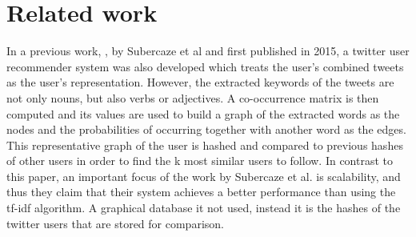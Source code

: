 \section{Related work}
\label{sec:relwork}
In a previous work, \cite{userRec},  by Subercaze et al and first published in 2015, a twitter user recommender system was also developed which treats the user’s combined tweets as the user’s representation. However, the extracted keywords of the tweets are not only nouns, but also verbs or adjectives. A co-occurrence matrix is then computed and its values are used to build a graph of the extracted words as the nodes and the probabilities of occurring together with another word as the edges. This representative graph of the user is hashed and compared to previous hashes of other users in order to find the k most similar users to follow. In contrast to this paper, an important focus of the work by Subercaze et al. is scalability, and thus they claim that their system achieves a better performance than using the tf-idf algorithm. A graphical database it not used, instead it is the hashes of the twitter users that are stored for comparison.



